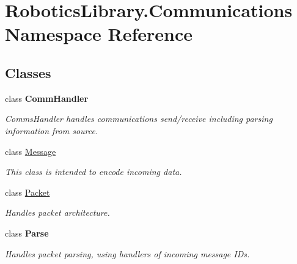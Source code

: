 \hypertarget{namespace_robotics_library_1_1_communications}{}\section{Robotics\+Library.\+Communications Namespace Reference}
\label{namespace_robotics_library_1_1_communications}
\subsection*{Classes}
\begin{DoxyCompactItemize}
\item 
class {\bfseries Comm\+Handler}
\begin{DoxyCompactList}\small\item\em Comms\+Handler handles communications send/receive including parsing information from source. \end{DoxyCompactList}\item 
class \hyperlink{class_robotics_library_1_1_communications_1_1_message}{Message}
\begin{DoxyCompactList}\small\item\em This class is intended to encode incoming data. \end{DoxyCompactList}\item 
class \hyperlink{class_robotics_library_1_1_communications_1_1_packet}{Packet}
\begin{DoxyCompactList}\small\item\em Handles packet architecture. \end{DoxyCompactList}\item 
class {\bfseries Parse}
\begin{DoxyCompactList}\small\item\em Handles packet parsing, using handlers of incoming message I\+Ds. \end{DoxyCompactList}\end{DoxyCompactItemize}
